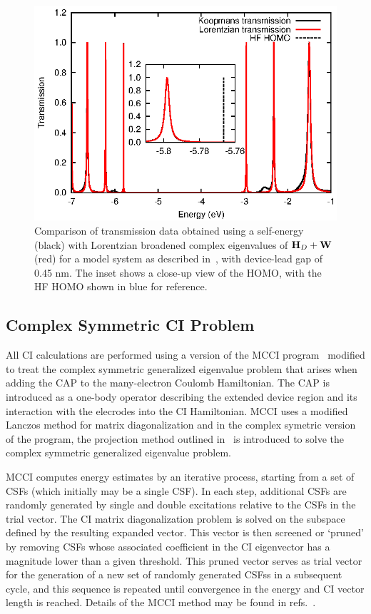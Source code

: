 \begin{figure} 
	\begin{center}
		\includegraphics[width=0.9\linewidth]{figures/figure3}
	\end{center}
	\caption{Comparison of transmission data obtained using a self-energy
	(black) with Lorentzian broadened complex eigenvalues of $\mathbf{H}_D + \mathbf{W}$
	(red) for a model system as described in~,
	with device-lead gap of 0.45 nm.
	The inset shows a close-up view of the \ac{HOMO}, with the HF \ac{HOMO}
	shown in blue for reference.
	}
	\label{fig:13evals}
\end{figure}

\subsection{Complex Symmetric \ac{CI} Problem}

All \ac{CI} calculations  are performed using a version of the \ac{MCCI}
program~\cite{mcci1995, mcci1998} modified to treat the complex
symmetric generalized eigenvalue problem that arises when adding the
\ac{CAP} to the many-electron Coulomb Hamiltonian. The \ac{CAP} is
introduced as a one-body operator describing the extended device region 
and its interaction with the elecrodes into the \ac{CI} Hamiltonian. 
\ac{MCCI} uses a modified Lanczos method for matrix diagonalization and
in the complex symetric version of the program, the projection method
outlined in~\cite{tarantelli_csd} is introduced to solve the complex
symmetric generalized eigenvalue problem. 

\ac{MCCI} computes energy estimates by an iterative process, starting from
a set of \acp{CSF} (which initially may be a single \ac{CSF}). In each step,
additional \acp{CSF} are randomly generated by single and double excitations
relative to the \acp{CSF} in the trial vector. The \ac{CI} matrix
diagonalization problem is solved on the subspace defined by the resulting
expanded vector. This vector is then screened or `pruned' by removing
\acp{CSF} whose associated coefficient in the \ac{CI} eigenvector has a
magnitude lower than a given threshold. This pruned vector serves as
trial vector for the generation of a new set of randomly generated
\acp{CSF}s in a subsequent cycle, and  this sequence is repeated until
convergence in the energy and CI vector length is reached. Details of the
\ac{MCCI} method may be found in 
refs.~\cite{mcci1995,mcci1998,mcci2000,multiref}.

